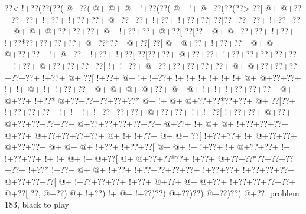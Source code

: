 \vbox{\vbox{\goo
\0??<\- !+\0??(\0??(\0??(\- @+\0??(\- @+\- @+\- @+\- !+\0??(\0??(\- @+\- !+\- @+\0??(\0??(\0??>
\0??[\- @+\- @+\0??+\0??+\0??+\- !+\0??+\- !+\0??+\0??+\- @+\0??+\0??+\- !+\0??+\- !+\0??+\0??[
\0??[\0??+\0??+\0??+\- !+\0??+\0??+\- @+\- @+\- @+\0??+\0??+\0??+\- @+\- !+\0??+\0??+\- @+\0??[
\0??[\0??+\- @+\- @+\0??+\0??+\- !+\0??+\- !+\0??*\0??+\0??+\0??+\0??+\- @+\0??*\0??+\- @+\0??[
\0??[\- @+\- @+\0??+\- !+\0??+\0??+\- @+\- @+\- @+\0??+\0??+\- !+\- @+\0??+\- !+\0??+\- !+\0??[
\0??[\0??+\0??+\- @+\0??+\0??+\- !+\0??+\0??+\0??+\0??+\0??+\- !+\0??+\- @+\0??+\0??+\0??+\0??[
\- !+\- !+\0??+\- @+\0??+\0??+\0??+\0??+\0??+\- @+\- @+\0??+\0??+\0??+\0??+\0??+\- !+\0??+\- @+
\0??[\- !+\0??+\- @+\- !+\- !+\0??+\- !+\- !+\- !+\- !+\- !+\- !+\- @+\- @+\0??+\0??+\- !+\- !+
\- @+\- !+\- !+\0??+\0??+\- @+\- @+\- @+\- @+\0??+\- @+\- @+\- !+\- !+\- !+\0??+\0??+\0??+\- @+
\- @+\0??+\- !+\0??*\- @+\0??+\0??+\0??+\0??+\0??*\- @+\- !+\- @+\- @+\0??+\0??*\0??+\0??+\- @+
\0??[\0??+\- !+\0??+\0??+\0??+\- !+\- !+\- !+\- !+\0??+\0??+\0??+\- @+\0??+\0??+\- !+\- !+\0??[
\- !+\0??+\0??+\- @+\0??+\- @+\0??+\0??+\0??+\0??+\- @+\0??+\0??+\0??+\0??+\0??+\- @+\0??+\- !+
\- @+\- @+\- !+\0??+\0??+\0??+\- @+\0??+\- @+\0??+\0??+\0??+\0??+\- @+\- !+\- !+\0??+\- @+\- @+
\0??[\- !+\0??+\0??+\- !+\- @+\0??+\0??+\- @+\0??+\0??+\- @+\- @+\- @+\- !+\0??+\- !+\0??+\0??[
\- @+\- @+\- !+\- !+\0??+\- !+\- @+\0??+\0??+\- !+\- !+\0??+\0??+\- !+\- !+\- @+\- !+\- @+\0??[
\- @+\- @+\0??+\0??*\0??+\- !+\0??+\- @+\0??+\0??*\0??+\0??+\0??+\0??+\- !+\0??*\- !+\0??+\- @+
\- @+\- !+\0??+\- !+\0??+\0??+\0??+\0??+\- !+\0??+\0??+\- !+\0??+\0??+\0??+\- @+\0??+\0??+\0??[
\- @+\- !+\0??+\0??+\0??+\- !+\0??+\- @+\0??+\- @+\- @+\0??+\- !+\0??+\0??+\0??+\0??+\- @+\0??[
\0??,\- @+\0??)\- @+\- !+\0??)\- !+\- @+\- !+\0??)\0??)\- @+\0??)\0??)\- @+\0??)\0??)\- @+\0??.
}
\hfil problem 183, black to play\hfil\break
}
